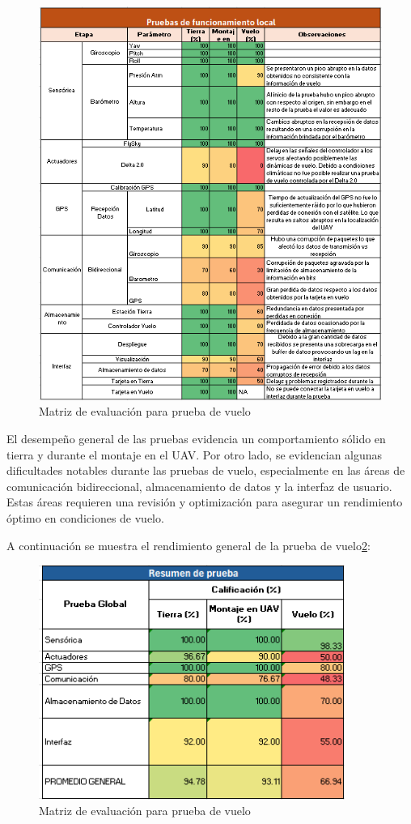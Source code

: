         \begin{figure}[H]
            \centering
            \includegraphics[width=\textwidth]{Imagenes/Pruebas/matriz_prueba_vuelo_local.png}
            \caption{Matriz de evaluación para prueba de vuelo}
            \label{fig:matriz_prueba_vuelo}
        \end{figure}

        El desempeño general de las pruebas evidencia un comportamiento sólido en tierra y durante el montaje en el UAV. Por otro lado, se evidencian algunas dificultades notables durante las pruebas de vuelo, especialmente en las áreas de comunicación bidireccional, almacenamiento de datos y la interfaz de usuario. Estas áreas requieren una revisión y optimización para asegurar un rendimiento óptimo en condiciones de vuelo.

        A continuación se muestra el rendimiento general de la prueba de vuelo\ref{fig:resumen_prueba_vuelo}:

        \begin{figure}[H]
            \centering
            \includegraphics[width=10cm]{Imagenes/Pruebas/resumen_prueba_vuelo_local.png}
            \caption{Matriz de evaluación para prueba de vuelo}
            \label{fig:resumen_prueba_vuelo}
        \end{figure}